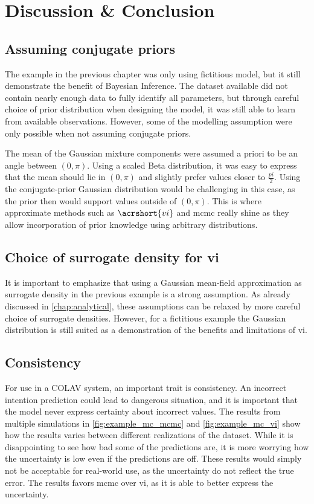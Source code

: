 \chapter{Discussion \& Conclusion}\label{chap:discussion}

\section{Assuming conjugate priors}
The example in the previous chapter was only using fictitious model, but it still demonstrate the benefit of Bayesian Inference. The dataset available did not contain nearly enough data to fully identify all parameters, but through careful choice of prior distribution when designing the model, it was still able to learn from available observations. However, some of the modelling assumption were only possible when not assuming conjugate priors.

The mean of the Gaussian mixture components were assumed a priori to be an angle between $(0, \pi)$. Using a scaled Beta distribution, it was easy to express that the mean should lie in $(0, \pi)$ and slightly prefer values closer to $\frac{pi}{2}$. Using the conjugate-prior Gaussian distribution would be challenging in this case, as the prior then would support values outside of $(0, \pi)$. This is where approximate methods such as $\acrshort{vi}$ and \acrshort{mcmc} really shine as they allow incorporation of prior knowledge using arbitrary distributions.  

\section{Choice of surrogate density for \acrshort{vi}}
It is important to emphasize that using a Gaussian mean-field approximation as surrogate density in the previous example is a strong assumption. As already discussed in \cref{chap:analytical}, these assumptions can be relaxed by more careful choice of surrogate densities. However, for a fictitious example the Gaussian distribution is still suited as a demonstration of the benefits and limitations of \acrshort{vi}.

\section{Consistency}
For use in a COLAV system, an important trait is consistency. An incorrect intention prediction could lead to dangerous situation, and it is important that the model never express certainty about incorrect values. The results from multiple simulations in \cref{fig:example_mc_mcmc} and \cref{fig:example_mc_vi} show how the results varies between different realizations of the dataset. While it is disappointing to see how bad some of the predictions are, it is more worrying how the uncertainty is low even if the predictions are off. These results would simply not be acceptable for real-world use, as the uncertainty do not reflect the true error. The results favors \acrshort{mcmc} over \acrshort{vi}, as it is able to better express the uncertainty.

